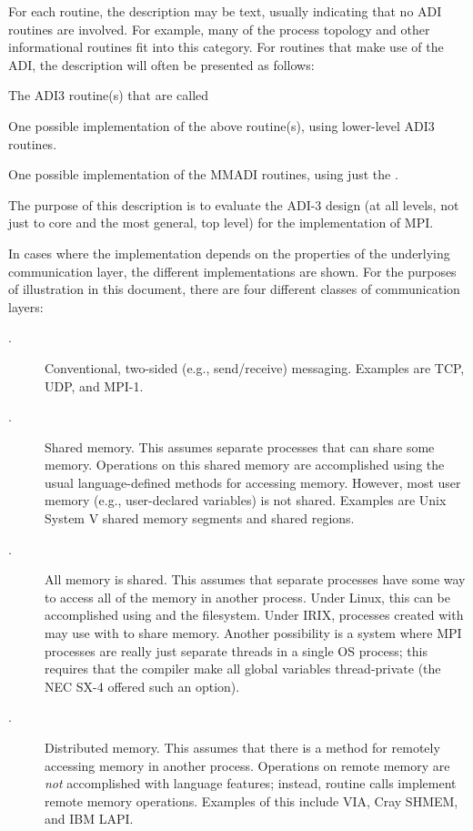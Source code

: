 \documentclass{article}
\begin{document}
For each routine, the description may be text, usually indicating that no ADI
routines are involved.  For example, many of the process topology and other
informational routines fit into this category.
For routines that make use of the ADI, the description will often be presented
as follows:
\begin{adi3}The ADI3 routine(s) that are called
\begin{mmadi}One possible implementation of the above routine(s), using
  lower-level ADI3 routines.
\begin{core}One possible implementation of the MMADI routines, using just the
  . 
\end{core}
\end{mmadi}
\end{adi3}
The purpose of this description is to evaluate the ADI-3 design (at all
levels, not just to core and the most general, top level) for the
implementation of MPI.  

In cases where the implementation depends on the properties of the
underlying communication layer, the different implementations are
shown.  For the purposes of illustration in this document, there are
four different classes of communication layers:
\begin{description}
\item[\tcpname.]Conventional, two-sided (e.g., send/receive)
messaging.  Examples are TCP, UDP, and MPI-1.  

\item[\shmemname.]Shared memory.  This assumes separate processes that
can share some memory.  Operations on this shared memory are
accomplished using the usual language-defined methods for accessing
memory.  However, most user memory (e.g., user-declared
variables) is not shared.  Examples are Unix System V shared memory
segments and shared  regions.  

\item[\shmemallname.]All memory is shared.  This assumes that separate
  processes have some way to access all of the memory in another process.
  Under Linux, this can be accomplished using  and the
   filesystem.  Under IRIX, processes created with
   may use  with  to share
  memory. Another possibility is a system where MPI 
  processes are really just separate threads in a single OS process; this
  requires that the compiler make all global variables thread-private (the NEC
  SX-4 offered such an option).

\item[\vianame.]Distributed memory.  This assumes that there is a
method for remotely accessing memory in another process.  Operations
on remote memory are \emph{not} accomplished with language features;
instead, routine calls implement remote memory operations.  Examples
of this include VIA, Cray SHMEM, and IBM LAPI.
\end{description}
\end{document}
